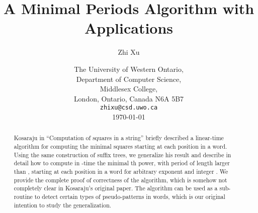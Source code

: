 \documentclass{article}
\title{A Minimal Periods Algorithm with Applications}
\author{Zhi Xu}
\date{The University of Western Ontario, \\
Department of Computer Science, \\
Middlesex College, \\
London, Ontario, Canada N6A 5B7 \\
{\tt zhi\us xu@csd.uwo.ca} \\
\medskip
\today}
\begin{document}
\maketitle


\begin{abstract}
Kosaraju in ``Computation of squares in a string'' briefly described a
linear-time algorithm for computing the minimal squares starting at
each position in a word. Using the same construction of suffix
trees, we generalize his result and describe in detail how to
compute in -time the minimal th power, with period
of length larger than , starting at each position in a word 
for arbitrary exponent  and integer . We provide the
complete proof of correctness of the algorithm, which is somehow not
completely clear in Kosaraju's original paper. The algorithm can be
used as a sub-routine to detect certain types of pseudo-patterns in
words, which is our original intention to study the generalization.
\end{abstract}
\end{document}
